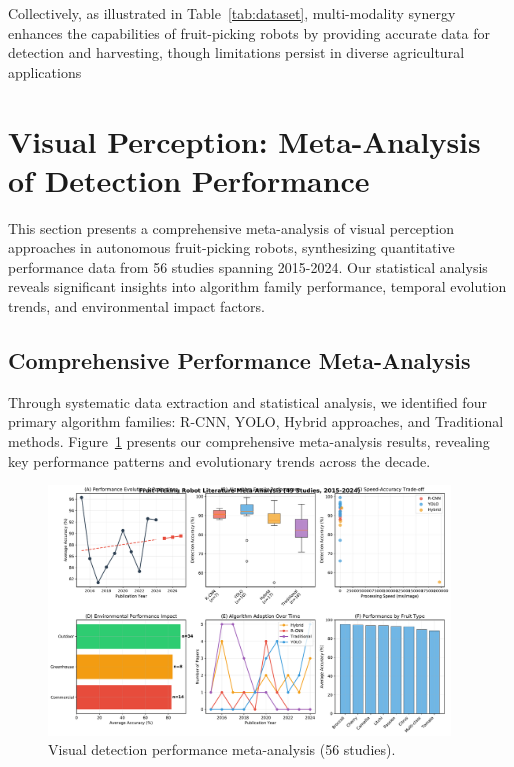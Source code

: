 \documentclass[pdflatex,sn-mathphys-num]{sn-jnl}
\begin{document}
Collectively, as illustrated in Table~\ref{tab:dataset}, multi-modality synergy enhances the capabilities of fruit-picking robots by providing accurate data for detection and harvesting, though limitations persist in diverse agricultural applications

\section{Visual Perception: Meta-Analysis of Detection Performance}
This section presents a comprehensive meta-analysis of visual perception approaches in autonomous fruit-picking robots, synthesizing quantitative performance data from 56 studies spanning 2015-2024. Our statistical analysis reveals significant insights into algorithm family performance, temporal evolution trends, and environmental impact factors.

\subsection{Comprehensive Performance Meta-Analysis}
Through systematic data extraction and statistical analysis, we identified four primary algorithm families: R-CNN, YOLO, Hybrid approaches, and Traditional methods. Figure~\ref{fig:meta_analysis} presents our comprehensive meta-analysis results, revealing key performance patterns and evolutionary trends across the decade.

\begin{figure}[htbp]
\centering
\includegraphics[width=0.95\textwidth]{fig_comprehensive_meta_analysis.pdf}
\caption{Visual detection performance meta-analysis (56 studies).}
\label{fig:meta_analysis}
\end{figure}
\end{document}
